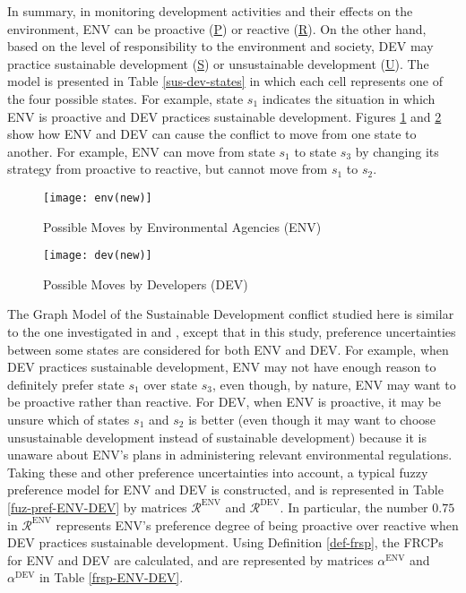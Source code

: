 In summary, in monitoring development activities and their effects on the environment, ENV can be proactive (\underline{P}) or reactive (\underline{R}). On the other hand, based on the level of responsibility to the environment and society, DEV may practice sustainable development (\underline{S}) or unsustainable development (\underline{U}). The model is presented in Table \ref{sus-dev-states} in which each cell represents one of the four possible states. For example, state $s_1$ indicates the situation in which ENV is proactive and DEV practices sustainable development. Figures \ref{moves-env} and \ref{moves-dev} show how ENV and DEV can cause the conflict to move from one state to another. For example, ENV can move from state $s_1$ to state $s_3$ by changing its strategy from proactive to reactive, but cannot move from $s_1$ to $s_2$.

\begin{figure}[h]
\centering
\texttt{[image: env(new)]}
\caption{Possible Moves by Environmental Agencies (ENV)}\label{moves-env}
\end{figure}

\begin{figure}[h]
\centering
\texttt{[image: dev(new)]}
\caption{Possible Moves by Developers (DEV)}\label{moves-dev}
\end{figure}

The Graph Model of the Sustainable Development conflict studied here is similar to the one investigated in \citep{Hipel2002} and \citep{Hipel&Walker2010}, except that in this study, preference uncertainties between some states are considered for both ENV and DEV. For example, when DEV practices sustainable development, ENV may not have enough reason to definitely prefer state $s_1$ over state $s_3$, even though, by nature, ENV may want to be proactive rather than reactive. For DEV, when ENV is proactive, it may be unsure which of states $s_1$ and $s_2$ is better (even though it may want to choose unsustainable development instead of sustainable development) because it is unaware about ENV's plans in administering relevant environmental regulations. Taking these and other preference uncertainties into account, a typical fuzzy preference model for ENV and DEV is constructed, and is represented in Table \ref{fuz-pref-ENV-DEV} by matrices $\mathcal{R}^{\text{ENV}}$ and $\mathcal{R}^{\text{DEV}}$. In particular, the number $0.75$ in $\mathcal{R}^{\text{ENV}}$ represents ENV's preference degree of being proactive over reactive when DEV practices sustainable development. Using Definition \ref{def-frsp}, the FRCPs for ENV and DEV are calculated, and are represented by matrices $\alpha^{\text{ENV}}$ and $\alpha^{\text{DEV}}$ in Table \ref{frsp-ENV-DEV}.


